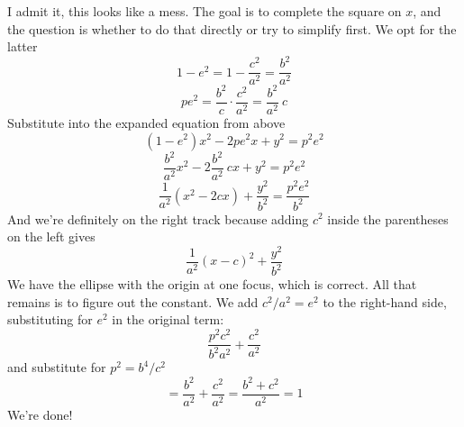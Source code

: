 \documentclass[11pt, oneside]{article}
\begin{document}
I admit it, this looks like a mess.  The goal is to complete the square on $x$, and the question is whether to do that directly or try to simplify first.  We opt for the latter
\[ 1 - e^2 = 1 - \frac{c^2}{a^2} = \frac{b^2}{a^2} \]
\[ pe^2 = \frac{b^2}{c} \cdot \frac{c^2}{a^2} = \frac{b^2}{a^2} \ c \]
Substitute into the expanded equation from above
\[ (1-e^2)x^2 - 2pe^2x + y^2 = p^2 e^2 \]
\[  \frac{b^2}{a^2} x^2 - 2 \frac{b^2}{a^2} \ cx + y^2 = p^2 e^2 \]
\[ \frac{1}{a^2} (x^2 - 2cx) + \frac{y^2}{b^2} = \frac{p^2 e^2}{b^2} \]
And we're definitely on the right track because adding $c^2$ inside the parentheses on the left gives
\[ \frac{1}{a^2} (x-c)^2 +  \frac{y^2}{b^2}  \]
We have the ellipse with the origin at one focus, which is correct.  All that remains is to figure out the constant.  We add $c^2/a^2  = e^2$ to the right-hand side, substituting for $e^2$ in the original term:
\[ \frac{p^2 c^2}{b^2 a^2} + \frac{c^2}{a^2}  \]
and substitute for $p^2 = b^4/c^2$
\[ = \frac{b^2}{a^2} + \frac{c^2}{a^2} = \frac{b^2 + c^2}{a^2} = 1 \]
We're done!
\end{document}

